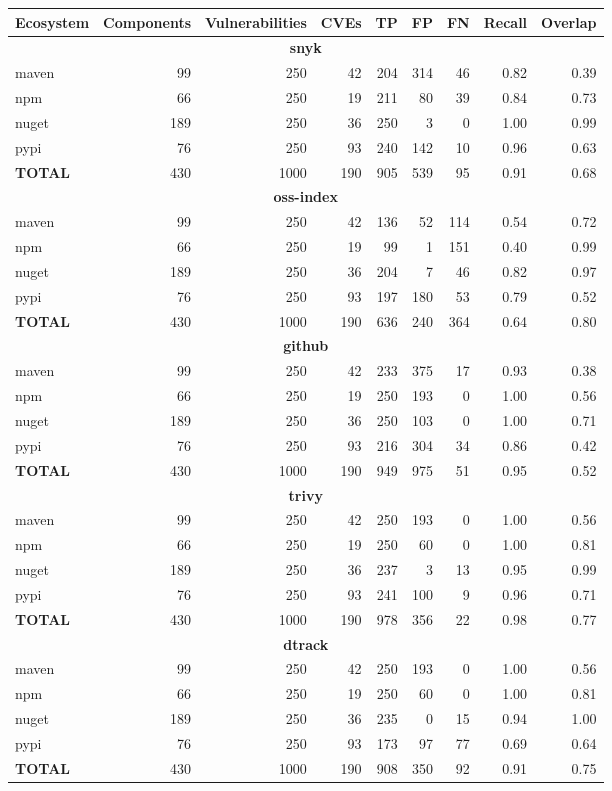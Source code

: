 \begin{table}[!t]
\centering
\small
\begin{tabular}{lrrrrrrrr}
\toprule
Ecosystem & Components & Vulnerabilities & CVEs & TP & FP & FN & Recall & Overlap \\
\midrule
\multicolumn{9}{c}{\textbf{snyk}} \\
\midrule
maven & 99 & 250 & 42 & 204 & 314 & 46 & 0.82 & 0.39 \\
npm & 66 & 250 & 19 & 211 & 80 & 39 & 0.84 & 0.73 \\
nuget & 189 & 250 & 36 & 250 & 3 & 0 & 1.00 & 0.99 \\
pypi & 76 & 250 & 93 & 240 & 142 & 10 & 0.96 & 0.63 \\
\midrule
\textbf{TOTAL} & 430 & 1000 & 190 & 905 & 539 & 95 & 0.91 & 0.68 \\
\midrule
\multicolumn{9}{c}{\textbf{oss-index}} \\
\midrule
maven & 99 & 250 & 42 & 136 & 52 & 114 & 0.54 & 0.72 \\
npm & 66 & 250 & 19 & 99 & 1 & 151 & 0.40 & 0.99 \\
nuget & 189 & 250 & 36 & 204 & 7 & 46 & 0.82 & 0.97 \\
pypi & 76 & 250 & 93 & 197 & 180 & 53 & 0.79 & 0.52 \\
\midrule
\textbf{TOTAL} & 430 & 1000 & 190 & 636 & 240 & 364 & 0.64 & 0.80 \\
\midrule
\multicolumn{9}{c}{\textbf{github}} \\
\midrule
maven & 99 & 250 & 42 & 233 & 375 & 17 & 0.93 & 0.38 \\
npm & 66 & 250 & 19 & 250 & 193 & 0 & 1.00 & 0.56 \\
nuget & 189 & 250 & 36 & 250 & 103 & 0 & 1.00 & 0.71 \\
pypi & 76 & 250 & 93 & 216 & 304 & 34 & 0.86 & 0.42 \\
\midrule
\textbf{TOTAL} & 430 & 1000 & 190 & 949 & 975 & 51 & 0.95 & 0.52 \\
\midrule
\multicolumn{9}{c}{\textbf{trivy}} \\
\midrule
maven & 99 & 250 & 42 & 250 & 193 & 0 & 1.00 & 0.56 \\
npm & 66 & 250 & 19 & 250 & 60 & 0 & 1.00 & 0.81 \\
nuget & 189 & 250 & 36 & 237 & 3 & 13 & 0.95 & 0.99 \\
pypi & 76 & 250 & 93 & 241 & 100 & 9 & 0.96 & 0.71 \\
\midrule
\textbf{TOTAL} & 430 & 1000 & 190 & 978 & 356 & 22 & 0.98 & 0.77 \\
\midrule
\multicolumn{9}{c}{\textbf{dtrack}} \\
\midrule
maven & 99 & 250 & 42 & 250 & 193 & 0 & 1.00 & 0.56 \\
npm & 66 & 250 & 19 & 250 & 60 & 0 & 1.00 & 0.81 \\
nuget & 189 & 250 & 36 & 235 & 0 & 15 & 0.94 & 1.00 \\
pypi & 76 & 250 & 93 & 173 & 97 & 77 & 0.69 & 0.64 \\
\midrule
\textbf{TOTAL} & 430 & 1000 & 190 & 908 & 350 & 92 & 0.91 & 0.75 \\
\midrule
\bottomrule
\end{tabular}
\end{table}
